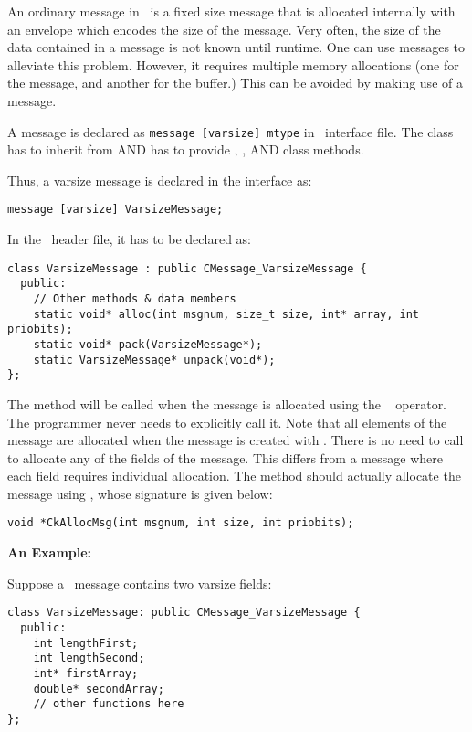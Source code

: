 An ordinary message in \charmpp\ is a fixed size message that is
allocated internally with an envelope which encodes the size of the
message. Very often, the size of the data contained in a message is
not known until runtime. One can use  messages to alleviate 
this problem. However, it requires multiple memory allocations (one
for the message, and another for the buffer.) This can be avoided by
making use of a  message.

A  message is declared as {\tt message [varsize] mtype} in
\charmpp\ interface file. The class  has to inherit from
 AND has to provide ,
, AND
 class methods.

Thus, a varsize message is declared in the interface as: 

\verb+message [varsize] VarsizeMessage;+ 

In the \CC\ header file, it has to be declared as: 

\begin{verbatim}
class VarsizeMessage : public CMessage_VarsizeMessage { 
  public:
    // Other methods & data members 
    static void* alloc(int msgnum, size_t size, int* array, int priobits);
    static void* pack(VarsizeMessage*);
    static VarsizeMessage* unpack(void*);
}; 
\end{verbatim}

The  method will be called when the message is allocated using
the \CC\  operator. The programmer never needs to explicitly
call it.  Note that all elements of the message are allocated when the message is created with .  There is no need to call  to allocate any of the fields of the message.  This differs from a  message where each field requires individual allocation.     
The  method should actually allocate the message using
, whose signature is given below:

\begin{verbatim}
void *CkAllocMsg(int msgnum, int size, int priobits); 
\end{verbatim}  

{\bf An Example:}

Suppose a \charmpp\ message contains two varsize fields:

\begin{verbatim} 
class VarsizeMessage: public CMessage_VarsizeMessage {
  public:
    int lengthFirst;
    int lengthSecond;
    int* firstArray;
    double* secondArray;
    // other functions here
};
\end{verbatim}

